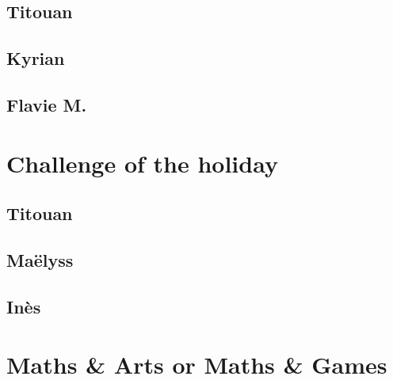 \documentclass[12pt,oneside]{report}
\begin{document}
\begin{spacing}{1.2}
\color{black}

\subsection*{Titouan}

\color{blue}

\color{black}

\subsection*{Kyrian}

\color{blue}

\color{black}

\subsection*{Flavie M.}

\color{blue}

\color{black}



\section{Challenge of the holiday}

\subsection*{Titouan}

\color{blue}

\color{black}

\subsection*{Maëlyss}

\color{blue}

\color{black}

\subsection*{Inès}

\color{blue}

\color{black}



\section{Maths \& Arts or Maths \& Games}





\end{spacing}
\end{document}
